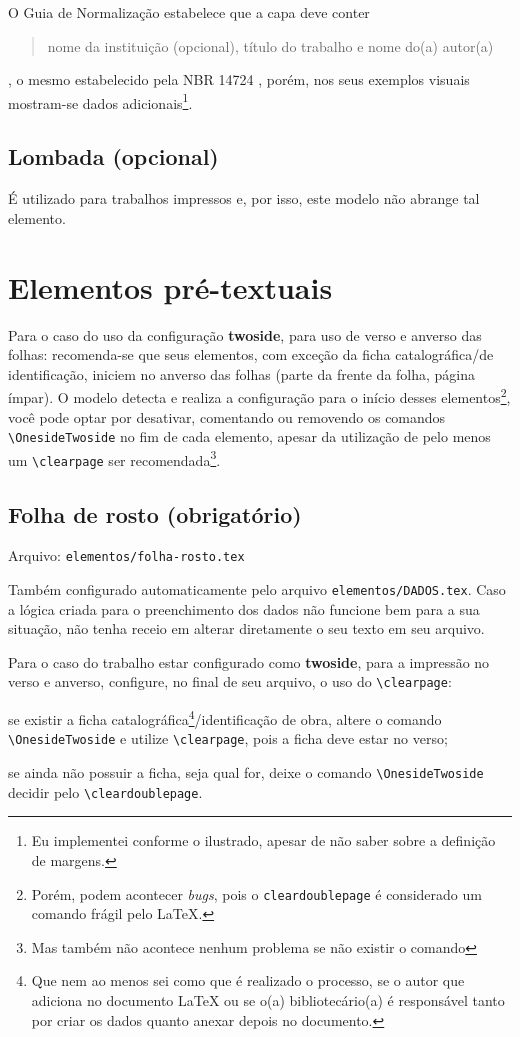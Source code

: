     O Guia de Normalização estabelece que a capa deve conter \blockcquote[p. 30]{livro:iffar-guia-normalizacao-2022}{nome da instituição (opcional), título do trabalho e nome do(a) autor(a)}, o mesmo estabelecido pela NBR 14724 \cite{livro:abnt-nbr:14724}, porém, nos seus exemplos visuais mostram-se dados adicionais\footnote{Eu implementei conforme o ilustrado, apesar de não saber sobre a definição de margens.}.

    \subsection{Lombada (opcional)}
    É utilizado para trabalhos impressos e, por isso, este modelo não abrange tal elemento.

\section{Elementos pré-textuais}
    Para o caso do uso da configuração \textbf{twoside}, para uso de verso e anverso das folhas: recomenda-se que seus elementos, com exceção da ficha catalográfica/de identificação, iniciem no anverso das folhas (parte da frente da folha, página ímpar). O modelo detecta e realiza a configuração para o início desses elementos\footnote{Porém, podem acontecer \textit{bugs}, pois o \texttt{cleardoublepage} é considerado um comando frágil pelo \LaTeX{}.}, você pode optar por desativar, comentando ou removendo os comandos \verb|\OnesideTwoside| no fim de cada elemento, apesar da utilização de pelo menos um \verb|\clearpage| ser recomendada\footnote{Mas também não acontece nenhum problema se não existir o comando}.

\subsection{Folha de rosto (obrigatório)}
    Arquivo: \texttt{elementos/folha-rosto.tex}

    Também configurado automaticamente pelo arquivo \texttt{elementos/DADOS.tex}. Caso a lógica criada para o preenchimento dos dados não funcione bem para a sua situação, não tenha receio em alterar diretamente o seu texto em seu arquivo.

    Para o caso do trabalho estar configurado como \textbf{twoside}, para a impressão no verso e anverso, configure, no final de seu arquivo, o uso do \verb|\clearpage|:
    \begin{alinea}
        \item se existir a ficha catalográfica\footnote{Que nem ao menos sei como que é realizado o processo, se o autor que adiciona no documento \LaTeX{} ou se o(a) bibliotecário(a) é responsável tanto por criar os dados quanto anexar depois no documento.}/identificação de obra, altere o comando \verb|\OnesideTwoside| e utilize \verb|\clearpage|, pois a ficha deve estar no verso;
        \item se ainda não possuir a ficha, seja qual for, deixe o comando \verb|\OnesideTwoside| decidir pelo \verb|\cleardoublepage|.
    \end{alinea}

